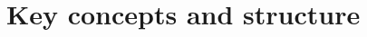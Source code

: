 \documentclass[11pt]{article}
\begin{document}
\begin{comment}
\noindent To clarify some of the important issues in designing the API, we note here some needs connected with a 3D
application:
\begin{itemize}
\item
When looping over the interior with loop indices $i,j,k$, often there are 1D arrays which are referenced using just one 
of the indices.

\item
To implement boundary conditions, we often loop over a 2D face, accessing both the 3D dataset and data from a 2D 
dataset.

\item
To implement periodic boundary conditions using dummy ``halo'' points, we sometimes have to copy one plane of boundary 
data to another.  e.g.~if the first dimension has size $I$ then we might copy the plane $i=I\!-\!2$ to plane $i=0$, and 
plane $i=1$ to plane $i=I\!-\!1$.

\item
In multigrid, we are working with two grids with one having twice as many points as the other in each direction.  To 
handle this we require a stencil with a non-unit stride.

\item
In multi-block grids, we have several structured blocks. The connectivity between the faces of different blocks can 
be quite complex, and in particular they may not be oriented in the same way, i.e.~an $i,j$ face of one block may 
correspond to the $j,k$ face of another block.  This is awkward and hard to handle simply.
\end{itemize}

\noindent The latest proposal is to handle all of these different requirements through stencil definitions.
\end{comment}

\section{Key concepts and structure}
\end{document}
